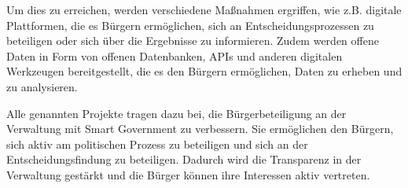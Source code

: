 Um dies zu erreichen, werden verschiedene Maßnahmen ergriffen, wie z.B. digitale Plattformen, die es Bürgern ermöglichen, sich an Entscheidungsprozessen zu beteiligen oder sich über die Ergebnisse zu informieren. 
Zudem werden offene Daten in Form von offenen Datenbanken, APIs und anderen digitalen Werkzeugen bereitgestellt, die es den Bürgern ermöglichen, Daten zu erheben und zu analysieren.
\par
Alle genannten Projekte tragen dazu bei, die Bürgerbeteiligung an der Verwaltung mit Smart Government zu verbessern. 
Sie ermöglichen den Bürgern, sich aktiv am politischen Prozess zu beteiligen und sich an der Entscheidungsfindung zu beteiligen. 
Dadurch wird die Transparenz in der Verwaltung gestärkt und die Bürger können ihre Interessen aktiv vertreten.